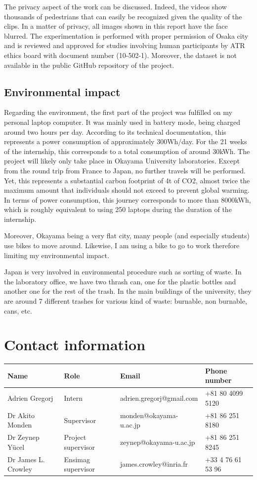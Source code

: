 \documentclass[12pt,a4paper,twoside]{article}
\begin{document}
The privacy aspect of the work can be discussed. Indeed, the videos show thousands of pedestrians that can easily be recognized given the quality of the clips. In a matter of privacy, all images shown in this report have the face blurred. The experimentation is performed with proper permission of Osaka city and is reviewed and approved for studies involving human participants by ATR ethics board with document number (10-502-1). Moreover, the dataset is not available in the public GitHub repository of the project. 


\subsection{Environmental impact}
Regarding the environment, the first part of the project was fulfilled on my personal laptop computer. It was mainly used in battery mode, being charged around two hours per day. According to its technical documentation, this represents a power consumption of approximately 300Wh/day. For the 21 weeks of the internship, this corresponds to a total consumption of around 30kWh.
The project will likely only take place in Okayama University laboratories. Except from the round trip from France to Japan, no further travels will be performed. Yet, this represents a substantial carbon footprint of 4t of CO2, almost twice the maximum amount that individuals should not exceed to prevent global warming. In terms of power consumption, this journey corresponds to more than 8000kWh, which is roughly equivalent to using 250 laptops during the duration of the internship. 

Moreover, Okayama being a very flat city, many people (and especially students) use bikes to move around. Likewise, I am using a bike to go to work therefore limiting my environmental impact. 

Japan is very involved in environmental procedure such as sorting of waste. In the laboratory office, we have two thrash can, one for the plastic bottles and another one for the rest of the trash. In the main buildings of the university, they are around 7 different trashes for various kind of waste: burnable, non burnable, cans, etc. 

{}


\newpage

\appendix
\section{Contact information}


\begin{tabular}{@{}llll@{}} \toprule
    Name & Role & Email & Phone number \\ \midrule
    Adrien Gregorj & Intern & adrien.gregorj@gmail.com & +81 80 4099 5120 \\
    Dr Akito Monden & Supervisor &  monden@okayama-u.ac.jp & +81 86 251 8180 \\
    Dr Zeynep Yücel & Project supervisor & zeynep@okayama-u.ac.jp & +81 86 251 8245 \\
    Dr James L. Crowley & Ensimag supervisor & james.crowley@inria.fr & +33 4 76 61 53 96 \\ \bottomrule
\end{tabular}
\end{document}
